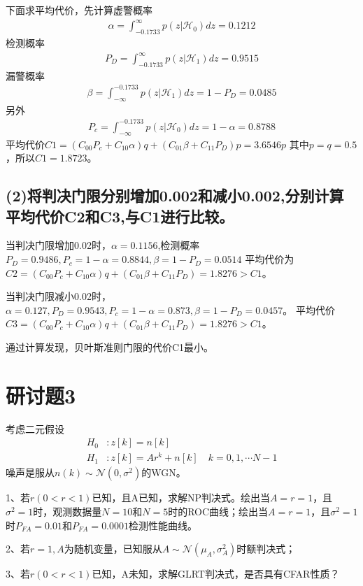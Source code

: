 \documentclass[fontset=windows]{article}
\numberwithin{figure}{section}
\begin{document}
下面求平均代价，先计算虚警概率
\begin{align*}
    \alpha=\int_{-0.1733}^{\infty}p(z|\mathcal{H}_0)dz=0.1212
\end{align*}
检测概率
\begin{align*}
    P_D=\int_{-0.1733}^{\infty}p(z|\mathcal{H}_1)dz=0.9515
\end{align*}
漏警概率
\begin{align*}
    \beta=\int_{-\infty}^{-0.1733}p(z|\mathcal{H}_1)dz=1-P_D=0.0485
\end{align*}
另外\begin{align*}
    P_c=\int_{-\infty}^{-0.1733}p(z|\mathcal{H}_0)dz=1-\alpha=0.8788
\end{align*}
平均代价\(C1=(C_{00}P_c+C_{10}\alpha)q+(C_{01}\beta+C_{11}P_D)p=3.6546p\)
其中\(p=q=0.5\)，所以\(C1=1.8723\)。
\subsection*{(2)将判决门限分别增加0.002和减小0.002,分别计算平均代价C2和C3,与C1进行比较。}
当判决门限增加0.02时，\(\alpha=0.1156\),检测概率\(P_D=0.9486,P_c=1-\alpha=0.8844,\beta=1-P_D=0.0514\)
平均代价为\(C2=(C_{00}P_c+C_{10}\alpha)q+(C_{01}\beta+C_{11}P_D)=1.8276>C1\)。

当判决门限减小0.02时，\(\alpha=0.127,P_D=0.9543,P_c=1-\alpha=0.873,\beta=1-P_D=0.0457\)。
平均代价\(C3=(C_{00}P_c+C_{10}\alpha)q+(C_01\beta+C_{11}P_D)=1.8276>C1\)。

通过计算发现，贝叶斯准则门限的代价C1最小。

\section*{研讨题3}
考虑二元假设
\begin{align*}
    H_0 & :z[k]=n[k]                            \\
    H_1 & :z[k]=Ar^k+n[k]\quad k=0,1,\cdots N-1
\end{align*}
噪声是服从\(n(k)\sim \mathcal{N}(0,\sigma^2)\)的WGN。

1、若\(r(0<r<1)\)已知，且A已知，求解NP判决式。绘出当\(A=r=1\)，且\(\sigma^2=1\)时，观测数据量\(N=10\)和\(N=5\)时的ROC曲线；绘出当\(A=r=1\)，且\(\sigma^2=1\)时\(P_{FA}=0.01\)和\(P_{FA}=0.0001\)检测性能曲线。

2、若\(r=1,A\)为随机变量，已知服从\(A\sim \mathcal{N}(\mu_A,\sigma_A^2)\)时额判决式；

3、若\(r(0<r<1)\)已知，A未知，求解GLRT判决式，是否具有CFAR性质？
\end{document}
